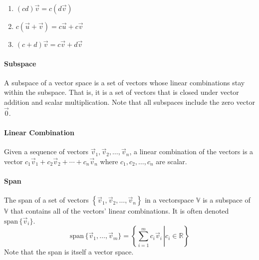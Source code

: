 \documentclass[10pt,landscape,letterpaper]{article}
\newcommand{\bvec}[1]{\mathbf{#1}}
\newcommand{\vecspace}[1]{\mathbb{#1}}
\begin{document}
\begin{multicols}{3}
\begin{multicols}{2}
\begin{enumerate}[leftmargin=*]
    \item $(cd)\vec{v}=c(d\vec{v})$
    
    \item $c(\vec{u}+\vec{v}) = c\vec{u} + c\vec{v}$
    
    \item $(c+d)\vec{v} = c\vec{v} + d\vec{v}$
    
\end{enumerate}
\end{multicols}

\paragraph{Subspace}
A subspace of a vector space is a set of vectors whose linear combinations stay within the subspace. That is, it is a set of vectors that is closed under vector addition and scalar multiplication. Note that all subspaces include the zero vector $\vec{0}$.

\paragraph{Linear Combination}
Given a sequence of vectors $\vec{v}_1, \vec{v}_2, \ldots, \vec{v}_n$, a linear combination of the vectors is a vector $c_1\vec{v}_1 + c_2\vec{v}_2 + \cdots + c_n\vec{v}_n$ where $c_1, c_2, \ldots, c_n$ are scalar.

\paragraph{Span} The span of a set of vectors $\left\{\vec{v}_1, \vec{v}_2, \ldots, \vec{v}_n\right\}$ in a vectorspace $\vecspace{V}$ is a subspace of $\vecspace{V}$ that contains all of the vectors' linear combinations. It is often denoted $\mathrm{span}\, \{\vec{v}_i\}$.
\begin{equation*}
\mathrm{span} \, \{\vec{v}_1, \dots, \vec{v}_m\} = \left \{ { \left. \sum_{i=1}^m c_i \vec{v}_i \, \right| c_i \in \vecspace{R} } \right \}
\end{equation*}
Note that the span is itself a vector space.


\end{multicols}
\end{document}
